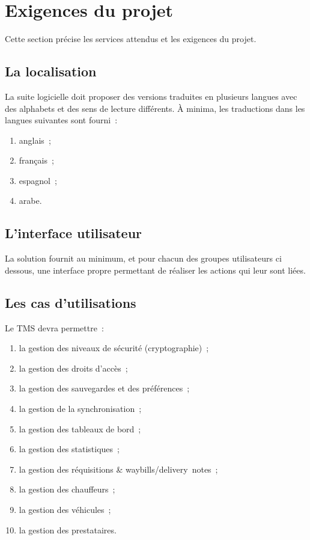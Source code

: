 \section{Exigences du projet}
Cette section précise les services attendus et les exigences du projet.

\subsection{La localisation}
La suite logicielle doit proposer des versions traduites en plusieurs langues avec des alphabets et des sens de lecture différents.
À minima, les traductions dans les langues suivantes sont fourni~:
\begin{enumerate}
	\item anglais~;
	\item français~;
	\item espagnol~;
	\item arabe.
\end{enumerate}

\subsection{L'interface utilisateur}
La solution fournit au minimum, et pour chacun des groupes utilisateurs ci dessous, une interface propre permettant de réaliser les actions qui leur sont liées.

\subsection{Les cas d'utilisations}
Le TMS devra permettre~:
\begin{enumerate}
	\item la gestion des niveaux de sécurité (cryptographie)~;
	\item la gestion des droits d'accès~;
	\item la gestion des sauvegardes et des préférences~; 
	\item la gestion de la synchronisation~;
	\item la gestion des tableaux de bord~;
	\item la gestion des statistiques~;
	\item la gestion des réquisitions \& waybills/delivery~notes~;
	\item la gestion des chauffeurs~;
	\item la gestion des véhicules~;
	\item la gestion des prestataires.
\end{enumerate}

